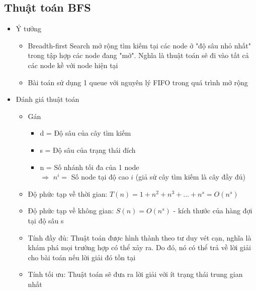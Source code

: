 \documentclass[a4paper, 12pt]{article}
\begin{document}
    \subsection{Thuật toán BFS}
    \begin{itemize}
        \item Ý tưởng
        \begin{itemize}
            \item Breadth-first Search mở rộng tìm kiếm tại các node ở "độ sâu nhỏ nhất" trong tập hợp các node đang "mở". Nghĩa là thuật toán sẽ đi vào tất cả các node kề với node hiện tại
            \item Bài toán sử dụng 1 queue với nguyên lý FIFO trong quá trình mở rộng
        \end{itemize}

        \item Đánh giá thuật toán
        \begin{itemize}
            \item Gán 
            \begin{itemize}
                \item d = Độ sâu của cây tìm kiếm
                \item s = Độ sâu của trạng thái đích
                \item n = Số nhánh tối đa của 1 node \\
                $\Rightarrow$ $n^i = $ Số node tại độ cao $i$ (giả sử cây tìm kiếm là cây đầy đủ)
            \end{itemize}

            \item Độ phức tạp về thời gian: $T(n) = 1 + n^2 + n^3 + ... + n^s = O(n^s)$
            \item Độ phức tạp về không gian: $S(n) = O(n^s)$ - kích thước của hàng đợi tại độ sâu s
            \item Tính đầy đủ: Thuật toán được hình thành theo tư duy vét cạn, nghĩa là khám phá mọi trường hợp có thể xảy ra. Do đó, nó có thể trả về lời giải cho bài toán nếu lời giải đó tồn tại
            \item Tính tối ưu: Thuật toán sẽ đưa ra lời giải với ít trạng thái trung gian nhất
        \end{itemize}
    \end{itemize}
\end{document}
